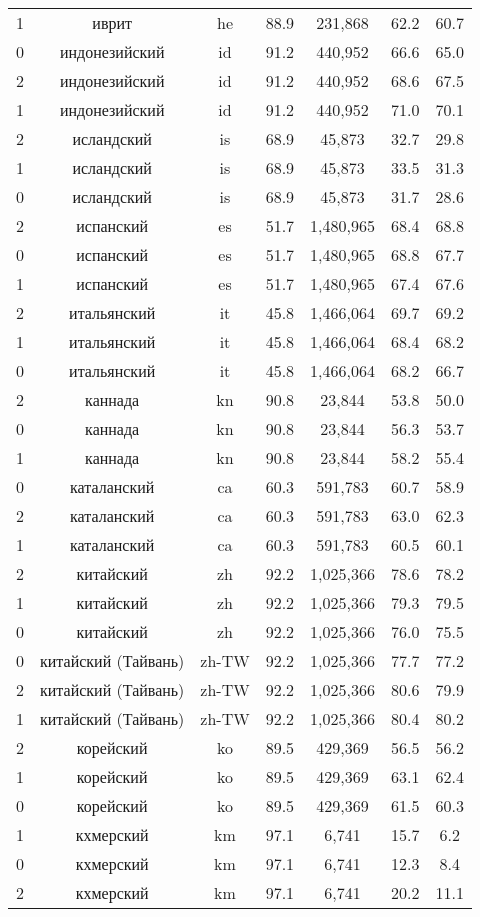 \begin{table*}
{\begin{tabular}{|c|c|c|c||c|c|c|}
1 & иврит & he & 88.9 & 231,868 & 62.2 & 60.7\\
0 & индонезийский & id & 91.2 & 440,952 & 66.6 & 65.0\\
2 & индонезийский & id & 91.2 & 440,952 & 68.6 & 67.5\\
1 & индонезийский & id & 91.2 & 440,952 & 71.0 & 70.1\\
2 & исландский & is & 68.9 & 45,873 & 32.7 & 29.8\\
1 & исландский & is & 68.9 & 45,873 & 33.5 & 31.3\\
0 & исландский & is & 68.9 & 45,873 & 31.7 & 28.6\\
2 & испанский & es & 51.7 & 1,480,965 & 68.4 & 68.8\\
0 & испанский & es & 51.7 & 1,480,965 & 68.8 & 67.7\\
1 & испанский & es & 51.7 & 1,480,965 & 67.4 & 67.6\\
2 & итальянский & it & 45.8 & 1,466,064 & 69.7 & 69.2\\
1 & итальянский & it & 45.8 & 1,466,064 & 68.4 & 68.2\\
0 & итальянский & it & 45.8 & 1,466,064 & 68.2 & 66.7\\
2 & каннада & kn & 90.8 & 23,844 & 53.8 & 50.0\\
0 & каннада & kn & 90.8 & 23,844 & 56.3 & 53.7\\
1 & каннада & kn & 90.8 & 23,844 & 58.2 & 55.4\\
0 & каталанский & ca & 60.3 & 591,783 & 60.7 & 58.9\\
2 & каталанский & ca & 60.3 & 591,783 & 63.0 & 62.3\\
1 & каталанский & ca & 60.3 & 591,783 & 60.5 & 60.1\\
2 & китайский & zh & 92.2 & 1,025,366 & 78.6 & 78.2\\
1 & китайский & zh & 92.2 & 1,025,366 & 79.3 & 79.5\\
0 & китайский & zh & 92.2 & 1,025,366 & 76.0 & 75.5\\
0 & китайский (Тайвань) & zh-TW & 92.2 & 1,025,366 & 77.7 & 77.2\\
2 & китайский (Тайвань) & zh-TW & 92.2 & 1,025,366 & 80.6 & 79.9\\
1 & китайский (Тайвань) & zh-TW & 92.2 & 1,025,366 & 80.4 & 80.2\\
2 & корейский & ko & 89.5 & 429,369 & 56.5 & 56.2\\
1 & корейский & ko & 89.5 & 429,369 & 63.1 & 62.4\\
0 & корейский & ko & 89.5 & 429,369 & 61.5 & 60.3\\
1 & кхмерский & km & 97.1 & 6,741 & 15.7 & 6.2\\
0 & кхмерский & km & 97.1 & 6,741 & 12.3 & 8.4\\
2 & кхмерский & km & 97.1 & 6,741 & 20.2 & 11.1\\
\end{tabular}
}
\end{table*}

